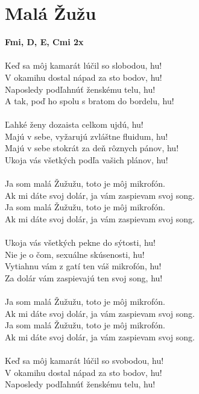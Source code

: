 \section{Malá Žužu}
\footnotesize\textbf{F\kr mi, D, E, C\kr mi 2x} \\
\normalsize
\\
Keď sa môj kamarát lúčil so slobodou, hu!\\ 
V okamihu dostal nápad za sto bodov, hu!\\
Naposledy podľahnúť ženskému telu, hu! \\
A tak, poď ho spolu s bratom do bordelu, hu! \\
\\
Ľahké ženy dozaista celkom ujdú, hu! \\
Majú v sebe, vyžarujú zvláštne fluidum, hu! \\
Majú v sebe stokrát za deň rôznych pánov, hu! \\
Ukoja vás všetkých podľa vašich plánov, hu! \\
\\
Ja som malá Žužužu, toto je môj mikrofón. \\
Ak mi dáte svoj dolár, ja vám zaspievam svoj song.\\
Ja som malá Žužužu, toto je môj mikrofón. \\
Ak mi dáte svoj dolár, ja vám zaspievam svoj song.\\
\\
Ukoja vás všetkých pekne do sýtosti, hu! \\
Nie je o čom, sexuálne skúsenosti, hu! \\
Vytiahnu vám z gatí ten váš mikrofón, hu! \\
Za dolár vám zaspievajú ten svoj song, hu! \\
\\
Ja som malá Žužužu, toto je môj mikrofón. \\
Ak mi dáte svoj dolár, ja vám zaspievam svoj song.\\
Ja som malá Žužužu, toto je môj mikrofón. \\
Ak mi dáte svoj dolár, ja vám zaspievam svoj song.\\
\\
Keď sa môj kamarát lúčil so svobodou, hu! \\
V okamihu dostal nápad za sto bodov, hu! \\
Naposledy podľahnúť ženskému telu, hu! \\
